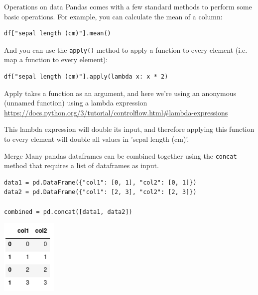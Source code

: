 \documentclass[10pt]{beamer}
\begin{document}
\begin{frame}[label={sec:org6ff4558},fragile]{Operations on data}
 Pandas comes with a few standard methods to perform some basic operations. For
example, you can calculate the mean of a column:

\begin{verbatim}
df["sepal length (cm)"].mean()
\end{verbatim}

And you can use the \texttt{apply()} method to apply a function to every element
(i.e. map a function to every element):

\begin{verbatim}
df["sepal length (cm)"].apply(lambda x: x * 2)
\end{verbatim}

Apply takes a function as an argument, and here we're using an anonymous
(unnamed function) using a lambda expression
\url{https://docs.python.org/3/tutorial/controlflow.html\#lambda-expressions}

This lambda expression will double its input, and therefore applying this
function to every element will double all values in 'sepal length (cm)'.
\end{frame}

\begin{frame}[label={sec:orgb9ab985},fragile]{Merge}
 Many pandas dataframes can be combined together using the \texttt{concat} method that
requires a list of dataframes as input.

\begin{verbatim}
data1 = pd.DataFrame({"col1": [0, 1], "col2": [0, 1]})
data2 = pd.DataFrame({"col1": [2, 3], "col2": [2, 3]})

combined = pd.concat([data1, data2])
\end{verbatim}

\begin{center}
\includegraphics[width=0.2\textwidth]{images/combined.png}
\end{center}
\end{frame}
\end{document}
